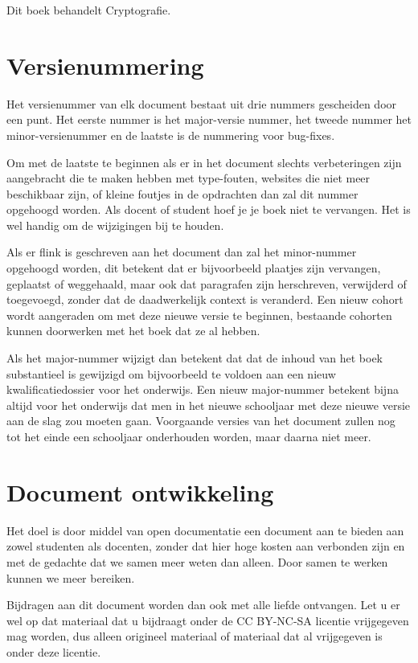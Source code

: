 Dit boek behandelt Cryptografie.

\section*{Versienummering}
Het versienummer van elk document bestaat uit drie nummers gescheiden door een punt. Het eerste nummer is het major-versie nummer, het tweede nummer het minor-versienummer en de laatste is de nummering voor bug-fixes.\par
Om met de laatste te beginnen als er in het document slechts verbeteringen zijn aangebracht die te maken hebben met type-fouten, websites die niet meer beschikbaar zijn, of kleine foutjes in de opdrachten dan zal dit nummer opgehoogd worden. Als docent of student hoef je je boek niet te vervangen. Het is wel handig om de wijzigingen bij te houden.\par
Als er flink is geschreven aan het document dan zal het minor-nummer opgehoogd worden, dit betekent dat er bijvoorbeeld plaatjes zijn vervangen, geplaatst of weggehaald, maar ook dat paragrafen zijn herschreven, verwijderd of toegevoegd, zonder dat de daadwerkelijk context is veranderd. Een nieuw cohort wordt aangeraden om met deze nieuwe versie te beginnen, bestaande cohorten kunnen doorwerken met het boek dat ze al hebben.\par
Als het major-nummer wijzigt dan betekent dat dat de inhoud van het boek substantieel is gewijzigd om bijvoorbeeld te voldoen aan een nieuw kwalificatiedossier voor het onderwijs. Een nieuw major-nummer betekent bijna altijd voor het onderwijs dat men in het nieuwe schooljaar met deze nieuwe versie aan de slag zou moeten gaan. Voorgaande versies van het document zullen nog tot het einde een schooljaar onderhouden worden, maar daarna niet meer.

\section*{Document ontwikkeling}
Het doel is door middel van open documentatie een document aan te bieden aan zowel studenten als docenten, zonder dat hier hoge kosten aan verbonden zijn en met de gedachte dat we samen meer weten dan alleen. Door samen te werken kunnen we meer bereiken.\par
Bijdragen aan dit document worden dan ook met alle liefde ontvangen. Let u er wel op dat materiaal dat u bijdraagt onder de CC BY-NC-SA licentie vrijgegeven mag worden, dus alleen origineel materiaal of materiaal dat al vrijgegeven is onder deze licentie.
